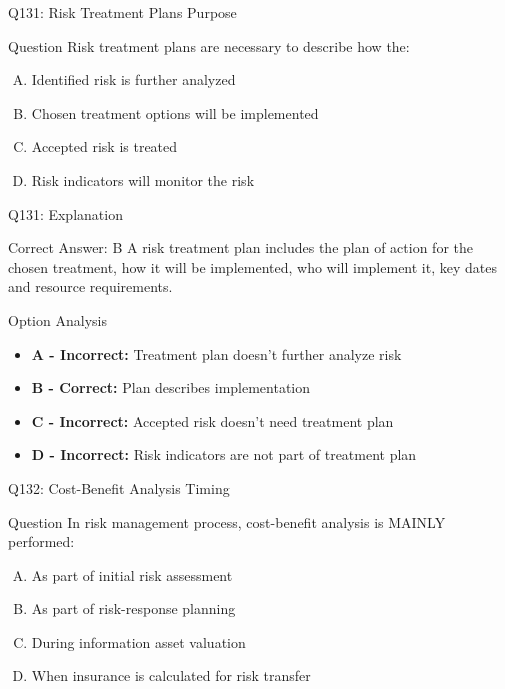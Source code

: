 \documentclass{beamer}
\begin{document}
	\begin{frame}{Q131: Risk Treatment Plans Purpose}
		\begin{block}{Question}
			Risk treatment plans are necessary to describe how the:
		\end{block}
		\begin{enumerate}[(A)]
			\item Identified risk is further analyzed
			\item Chosen treatment options will be implemented
			\item Accepted risk is treated
			\item Risk indicators will monitor the risk
		\end{enumerate}
	\end{frame}
	
	\begin{frame}{Q131: Explanation}
		\begin{block}{Correct Answer: B}
			A risk treatment plan includes the plan of action for the chosen treatment, how it will be implemented, who will implement it, key dates and resource requirements.
		\end{block}
		\begin{block}{Option Analysis}
			\begin{itemize}
				\item \textbf{A - Incorrect:} Treatment plan doesn't further analyze risk
				\item \textbf{B - Correct:} Plan describes implementation
				\item \textbf{C - Incorrect:} Accepted risk doesn't need treatment plan
				\item \textbf{D - Incorrect:} Risk indicators are not part of treatment plan
			\end{itemize}
		\end{block}
	\end{frame}
	
	\begin{frame}{Q132: Cost-Benefit Analysis Timing}
		\begin{block}{Question}
			In risk management process, cost-benefit analysis is MAINLY performed:
		\end{block}
		\begin{enumerate}[(A)]
			\item As part of initial risk assessment
			\item As part of risk-response planning
			\item During information asset valuation
			\item When insurance is calculated for risk transfer
		\end{enumerate}
	\end{frame}
	
\end{document}
